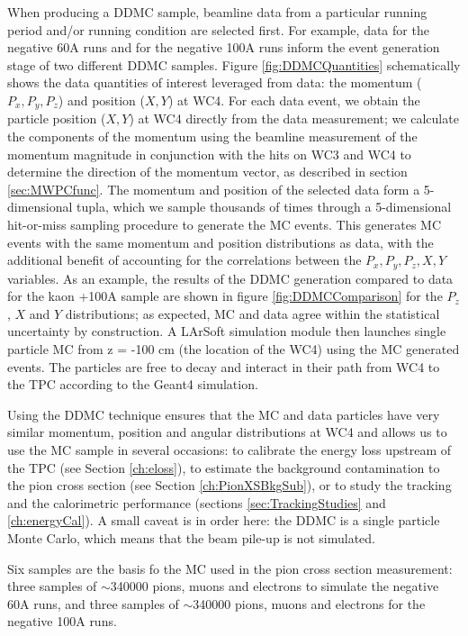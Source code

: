 When producing a DDMC sample, beamline data from a particular running period and/or running condition are selected first. For example, data for the negative 60A runs and for the negative 100A runs inform the event generation stage of two different DDMC samples. Figure \ref{fig:DDMCQuantities}  schematically shows the data quantities of interest leveraged from data: the momentum ($P_x, P_y, P_z$) and position ($X, Y$) at WC4. For each data event, we obtain the  particle position ($X, Y$) at WC4 directly from the data measurement; we calculate the components of the momentum using the beamline measurement of the momentum magnitude in conjunction with the hits on WC3 and WC4 to determine the direction of the momentum vector, as described in section \ref{sec:MWPCfunc}. The momentum and position of the selected data form a 5-dimensional tupla, which we sample thousands of times through a 5-dimensional hit-or-miss sampling procedure to generate the MC events. This generates MC events  with the same momentum and position distributions as data, with the additional benefit of accounting for the correlations between the $P_x, P_y, P_z, X, Y$ variables.  As an example, the results of the DDMC generation compared to data for the kaon +100A sample are shown in figure \ref{fig:DDMCComparison} for the $P_z$, $X$ and $Y$ distributions; as expected, MC and data agree within the statistical uncertainty by construction. A LArSoft simulation module then launches single particle MC from z = -100 cm (the location of the WC4) using the MC generated events. The particles are free to decay and interact in their path from WC4 to the TPC according to the Geant4 simulation.

Using the DDMC technique ensures that the MC and data particles have very similar momentum, position and angular distributions at WC4 and allows us to use the MC sample in several occasions: to calibrate the energy loss upstream of the TPC (see Section \ref{ch:eloss}), to estimate the background contamination to the pion cross section (see Section \ref{ch:PionXSBkgSub}), or to study the tracking and the calorimetric performance (sections \ref{sec:TrackingStudies} and \ref{ch:energyCal}). A small caveat is in order here: the DDMC is a single particle Monte Carlo, which means that the beam pile-up is not simulated. 


Six samples are the basis fo the MC used in the pion cross section measurement: three samples of  $\sim$340000 pions, muons and electrons to simulate the negative 60A runs, and three samples of $\sim$340000 pions, muons and electrons for the negative 100A runs.


